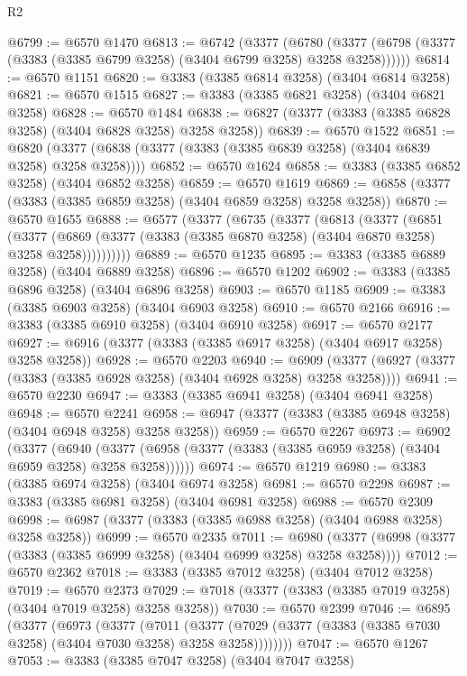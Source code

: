 \begin{lexlean}{R2}
\begin{coremodule}
@6799 := @6570 @1470
@6813 := @6742
    (@3377
      (@6780 (@3377 (@6798 (@3377 (@3383 (@3385 @6799 @3258) (@3404 @6799 @3258) @3258 @3258))))))
@6814 := @6570 @1151
@6820 := @3383 (@3385 @6814 @3258) (@3404 @6814 @3258)
@6821 := @6570 @1515
@6827 := @3383 (@3385 @6821 @3258) (@3404 @6821 @3258)
@6828 := @6570 @1484
@6838 := @6827 (@3377 (@3383 (@3385 @6828 @3258) (@3404 @6828 @3258) @3258 @3258))
@6839 := @6570 @1522
@6851 := @6820 (@3377 (@6838 (@3377 (@3383 (@3385 @6839 @3258) (@3404 @6839 @3258) @3258 @3258))))
@6852 := @6570 @1624
@6858 := @3383 (@3385 @6852 @3258) (@3404 @6852 @3258)
@6859 := @6570 @1619
@6869 := @6858 (@3377 (@3383 (@3385 @6859 @3258) (@3404 @6859 @3258) @3258 @3258))
@6870 := @6570 @1655
@6888 := @6577
    (@3377
      (@6735
        (@3377
          (@6813
            (@3377
              (@6851
                (@3377
                  (@6869 (@3377 (@3383 (@3385 @6870 @3258) (@3404 @6870 @3258) @3258 @3258))))))))))
@6889 := @6570 @1235
@6895 := @3383 (@3385 @6889 @3258) (@3404 @6889 @3258)
@6896 := @6570 @1202
@6902 := @3383 (@3385 @6896 @3258) (@3404 @6896 @3258)
@6903 := @6570 @1185
@6909 := @3383 (@3385 @6903 @3258) (@3404 @6903 @3258)
@6910 := @6570 @2166
@6916 := @3383 (@3385 @6910 @3258) (@3404 @6910 @3258)
@6917 := @6570 @2177
@6927 := @6916 (@3377 (@3383 (@3385 @6917 @3258) (@3404 @6917 @3258) @3258 @3258))
@6928 := @6570 @2203
@6940 := @6909 (@3377 (@6927 (@3377 (@3383 (@3385 @6928 @3258) (@3404 @6928 @3258) @3258 @3258))))
@6941 := @6570 @2230
@6947 := @3383 (@3385 @6941 @3258) (@3404 @6941 @3258)
@6948 := @6570 @2241
@6958 := @6947 (@3377 (@3383 (@3385 @6948 @3258) (@3404 @6948 @3258) @3258 @3258))
@6959 := @6570 @2267
@6973 := @6902
    (@3377
      (@6940 (@3377 (@6958 (@3377 (@3383 (@3385 @6959 @3258) (@3404 @6959 @3258) @3258 @3258))))))
@6974 := @6570 @1219
@6980 := @3383 (@3385 @6974 @3258) (@3404 @6974 @3258)
@6981 := @6570 @2298
@6987 := @3383 (@3385 @6981 @3258) (@3404 @6981 @3258)
@6988 := @6570 @2309
@6998 := @6987 (@3377 (@3383 (@3385 @6988 @3258) (@3404 @6988 @3258) @3258 @3258))
@6999 := @6570 @2335
@7011 := @6980 (@3377 (@6998 (@3377 (@3383 (@3385 @6999 @3258) (@3404 @6999 @3258) @3258 @3258))))
@7012 := @6570 @2362
@7018 := @3383 (@3385 @7012 @3258) (@3404 @7012 @3258)
@7019 := @6570 @2373
@7029 := @7018 (@3377 (@3383 (@3385 @7019 @3258) (@3404 @7019 @3258) @3258 @3258))
@7030 := @6570 @2399
@7046 := @6895
    (@3377
      (@6973
        (@3377
          (@7011
            (@3377 (@7029 (@3377 (@3383 (@3385 @7030 @3258) (@3404 @7030 @3258) @3258 @3258))))))))
@7047 := @6570 @1267
@7053 := @3383 (@3385 @7047 @3258) (@3404 @7047 @3258)

\end{coremodule}
\end{lexlean}
